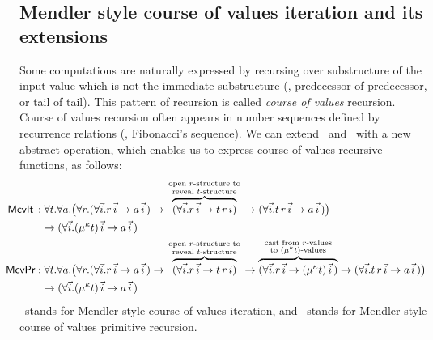 \subsection{Mendler style course of values iteration and its extensions}
Some computations are naturally expressed by recursing over substructure
of the input value which is not the immediate substructure (\eg, predecessor of predecessor,
or tail of tail). This pattern of recursion is called \emph{course of values}
recursion. Course of values recursion often appears in number sequences
defined by recurrence relations (\eg, Fibonacci's sequence).
We can extend \MIt\ and \MPr\ with a new abstract operation, which enables
us to express course of values recursive functions, as follows:
\label{sec:mendler:cv}
\begin{align*}
\!\!\!\!\!\!\!\!
 \McvIt\, :&\; \forall t . \forall a .
   \big( \forall r .
         (\forall\vec{i} . r\,\vec{i} -> a\,\vec{i}\,)
   -> \overbraceset{\begin{smallmatrix}
                     \text{open $r$-structure to} \\
                     \text{reveal $t$-structure} \\
                    \end{smallmatrix}}{
         (\forall\vec{i} . r\,\vec{i} -> t\,r\, i) }
   ->    (\forall\vec{i} . t\, r\,\vec{i} -> a\,\vec{i}\,)
   \big) \\
& -> (\forall\vec{i} . (\mu^\kappa t)\,\vec{i} -> a\,\vec{i}\,) \\
\!\!\!\!\!\!\!\!
 \McvPr :&\; \forall t . \forall a .
   \big( \forall r .   
         (\forall\vec{i} . r\,\vec{i} -> a\,\vec{i}\,)
   -> \overbraceset{\begin{smallmatrix}
                     \text{open $r$-structure to} \\
                     \text{reveal $t$-structure} \\
                    \end{smallmatrix}}{
         (\forall\vec{i} . r\,\vec{i} -> t\,r\,i) }
   -> \overbraceset{\begin{smallmatrix}
                     \text{cast from $r$-values} \\
                     \text{to $(\mu^\kappa t)$-values} \\
                    \end{smallmatrix}}{
         (\forall\vec{i} . r\,\vec{i} -> (\mu^\kappa t)\,\vec{i}\,) }
   ->    (\forall\vec{i} . t\, r\,\vec{i} -> a\,\vec{i}\,)
   \big)\\ 
& -> (\forall\vec{i} . (\mu^\kappa t)\,\vec{i} -> a\,\vec{i}\,)
\end{align*}
\McvIt\ stands for Mendler style course of values iteration,
and \McvPr\ stands for Mendler style course of values primitive recursion.


